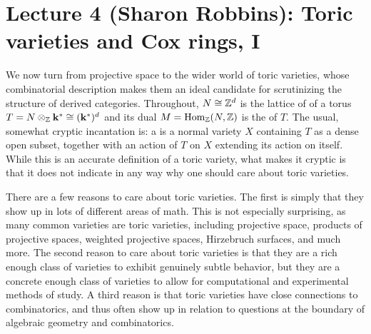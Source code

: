 \documentclass{amsart}
\begin{document}
\fi

\section{Lecture 4 (Sharon Robbins): Toric varieties and Cox rings, I}\label{lec:4-toric-cox}


We now turn from projective space to the wider world of toric varieties, whose combinatorial description makes them an ideal candidate for scrutinizing the structure of derived categories. Throughout, $N\cong\mathbb Z^d$ is the lattice of  of a torus $T = N\otimes_\mathbb Z {\bf k}^*\cong({\bf k}^*)^d$ and its dual $M=\operatorname{Hom}_\mathbb Z(N,\mathbb Z)$ is the  of $T$. The usual, somewhat cryptic incantation is: a  is a normal variety $X$ containing $T$ as a dense open subset, together with an action of $T$ on $X$ extending its action on itself. While this is an accurate definition of a toric variety, what makes it cryptic is that it does not indicate in any way why one should care about toric varieties.

There are a few reasons to care about toric varieties.  The first is simply that they show up in lots of different areas of math.  This is not especially surprising, as many common varieties are toric varieties, including projective space, products of projective spaces, weighted projective spaces, Hirzebruch surfaces, and much more.  The second reason to care about toric varieties is that they are a rich enough class of varieties to exhibit genuinely subtle behavior, but they are a concrete enough class of varieties to allow for computational and experimental methods of study.  A third reason is that toric varieties have close connections to combinatorics, and thus often show up in relation to questions at the boundary of algebraic geometry and combinatorics.
\end{document}
